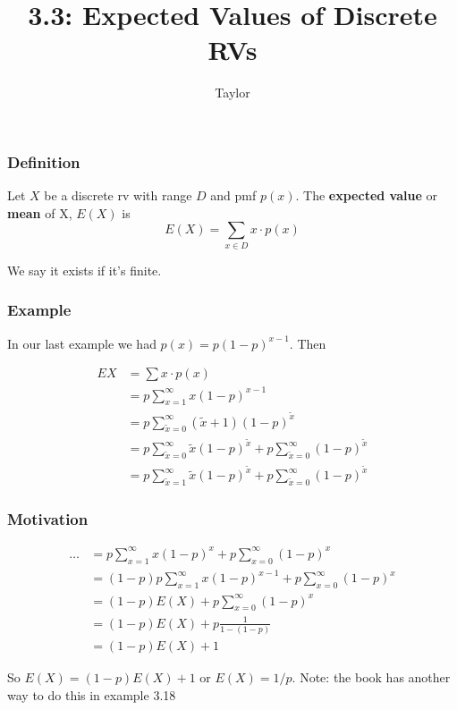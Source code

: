\documentclass{beamer}
\title["3.3"]{3.3: Expected Values of Discrete RVs}
\author{Taylor}
\institute[UVA] 
{
University of Virginia \\
\medskip
\textit{} 
}
\date{}
\begin{document}

\begin{frame}
\titlepage 
\end{frame}
\begin{frame}
\frametitle{Definition}

Let $X$ be a discrete rv with range $D$ and pmf $p(x)$. The \textbf{expected value} or \textbf{mean} of X, $E(X)$ is 
\[
E(X) = \sum_{x \in D} x \cdot p(x)
\]

We say it exists if it's finite.
\end{frame}


\begin{frame}
\frametitle{Example}

In our last example we had $p(x) = p(1-p)^{x-1}$. Then

\begin{align*}
EX &= \sum x \cdot p(x) \\
&= p \sum_{x=1}^{\infty} x (1-p)^{x-1} \\
&= p \sum_{\tilde{x}=0}^{\infty} (\tilde{x}+1) (1-p)^{\tilde{x}} \\
&= p \sum_{\tilde{x}=0}^{\infty}\tilde{x} (1-p)^{\tilde{x}} + p \sum_{\tilde{x}=0}^{\infty} (1-p)^{\tilde{x}} \\
&= p \sum_{\tilde{x}=1}^{\infty}\tilde{x} (1-p)^{\tilde{x}} + p \sum_{\tilde{x}=0}^{\infty} (1-p)^{\tilde{x}} 
\end{align*}

\end{frame}


\begin{frame}
\frametitle{Motivation}

\begin{align*}
\ldots &= p \sum_{x=1}^{\infty}x (1-p)^{x} + p \sum_{x=0}^{\infty} (1-p)^{x} \\
&= (1-p) p\sum_{x=1}^{\infty}x (1-p)^{x-1} + p \sum_{x=0}^{\infty} (1-p)^{x} \\
&= (1-p) E(X) + p \sum_{x=0}^{\infty} (1-p)^{x} \\
&= (1-p) E(X) + p \frac{1}{1-(1-p)} \\
&= (1-p) E(X) + 1
\end{align*}

So $E(X) = (1-p) E(X) + 1$ or $E(X) = 1/p$. Note: the book has another way to do this in example 3.18

\end{frame}
\end{document}
